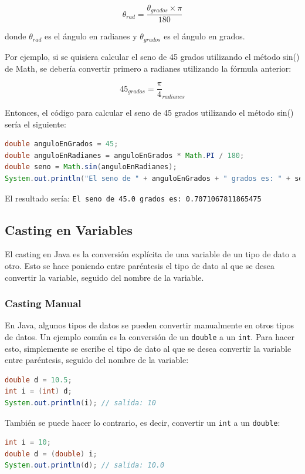 \documentclass[executivepaper]{article}
\begin{document}
$$\theta_{rad} = \frac{\theta_{grados} \times \pi}{180}$$

donde $\theta_{rad}$ es el ángulo en radianes y $\theta_{grados}$ es el ángulo en grados.

Por ejemplo, si se quisiera calcular el seno de 45 grados utilizando el método sin() de Math, se debería convertir primero a radianes utilizando la fórmula anterior:

$$45_{grados} = \frac{\pi}{4}_{radianes}$$

Entonces, el código para calcular el seno de 45 grados utilizando el método sin() sería el siguiente:

\begin{lstlisting}[language=Java]
double anguloEnGrados = 45;
double anguloEnRadianes = anguloEnGrados * Math.PI / 180;
double seno = Math.sin(anguloEnRadianes);
System.out.println("El seno de " + anguloEnGrados + " grados es: " + seno);
\end{lstlisting}
El resultado sería: \lstinline{El seno de 45.0 grados es: 0.7071067811865475}

\subsection{Casting en Variables}

El casting en Java es la conversión explícita de una variable de un tipo de dato a otro. Esto se hace poniendo entre paréntesis el tipo de dato al que se desea convertir la variable, seguido del nombre de la variable.

\subsubsection{Casting Manual}

En Java, algunos tipos de datos se pueden convertir manualmente en otros tipos de datos. Un ejemplo común es la conversión de un \texttt{double} a un \texttt{int}. Para hacer esto, simplemente se escribe el tipo de dato al que se desea convertir la variable entre paréntesis, seguido del nombre de la variable:

\begin{lstlisting}[language=Java]
double d = 10.5;
int i = (int) d;
System.out.println(i); // salida: 10
\end{lstlisting}

También se puede hacer lo contrario, es decir, convertir un \texttt{int} a un \texttt{double}:

\begin{lstlisting}[language=Java]
int i = 10;
double d = (double) i;
System.out.println(d); // salida: 10.0
\end{lstlisting}
\end{document}
